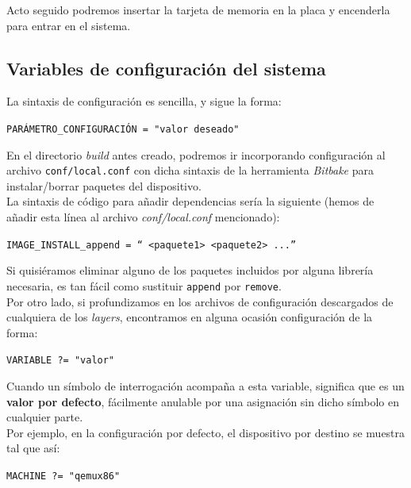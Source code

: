 Acto seguido podremos insertar la tarjeta de memoria en la placa y encenderla para entrar en el sistema.

\subsection{Variables de configuración del sistema}

La sintaxis de configuración es sencilla, y sigue la forma: 

\begin{center}
	\texttt{PARÁMETRO\_CONFIGURACIÓN = "valor deseado"}
\end{center}

En el directorio \textit{build} antes creado, podremos ir incorporando configuración al archivo \texttt{conf/local.conf} con dicha sintaxis de la herramienta \textit{Bitbake} para instalar/borrar paquetes del dispositivo.\\

La sintaxis de código para añadir dependencias sería la siguiente (hemos de añadir esta línea al archivo \textit{conf/local.conf} mencionado):

\begin{center}
\texttt{IMAGE\_INSTALL\_append = `` <paquete1> <paquete2> ...''}
\end{center}

Si quisiéramos eliminar alguno de los paquetes incluidos por alguna librería necesaria, es tan fácil como sustituir \texttt{append} por \texttt{remove}.\\

Por otro lado, si profundizamos en los archivos de configuración descargados de cualquiera de los \textit{layers}, encontramos en alguna ocasión configuración de la forma:

\begin{center}
\texttt{VARIABLE ?= "valor"}
\end{center}

Cuando un símbolo de interrogación acompaña a esta variable, significa que es un \textbf{valor por defecto}, fácilmente anulable por una asignación sin dicho símbolo en cualquier parte.\\

Por ejemplo, en la configuración por defecto, el dispositivo por destino se muestra tal que así:

\begin{center}
\texttt{MACHINE ?= "qemux86"}
\end{center}


